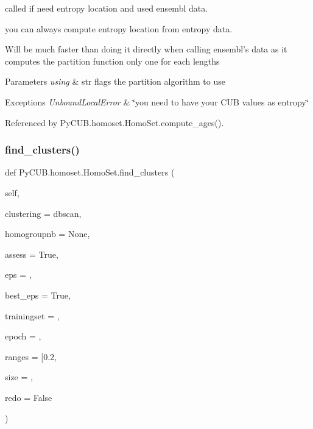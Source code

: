 called if need entropy location and used ensembl data. 

you can always compute entropy location from entropy data. \begin{DoxyVerb}   Will be much faster than doing it directly when calling
   ensembl's data as it computes the partition function
   only one for each lengths
\end{DoxyVerb}



\begin{DoxyParams}{Parameters}
{\em using} & str flags the partition algorithm to use\\
\hline
\end{DoxyParams}

\begin{DoxyExceptions}{Exceptions}
{\em Unbound\+Local\+Error} & \char`\"{}you need to have your C\+U\+B values as entropy\char`\"{} \\
\hline
\end{DoxyExceptions}


Referenced by Py\+C\+U\+B.\+homoset.\+Homo\+Set.\+compute\+\_\+ages().

\mbox{\label{class_py_c_u_b_1_1homoset_1_1_homo_set_a81b40822ff0d1d3e0cfccd6c3c54cdd6}} 
\subsubsection{\texorpdfstring{find\+\_\+clusters()}{find\_clusters()}}
{\footnotesize\ttfamily def Py\+C\+U\+B.\+homoset.\+Homo\+Set.\+find\+\_\+clusters (\begin{DoxyParamCaption}\item[{}]{self,  }\item[{}]{clustering = {\ttfamily \textquotesingle{}dbscan\textquotesingle{}},  }\item[{}]{homogroupnb = {\ttfamily None},  }\item[{}]{assess = {\ttfamily True},  }\item[{}]{eps = {},  }\item[{}]{best\+\_\+eps = {\ttfamily True},  }\item[{}]{trainingset = {},  }\item[{}]{epoch = {},  }\item[{}]{ranges = {\ttfamily \mbox{[}0.2},  }\item[{}]{size = {},  }\item[{}]{redo = {\ttfamily False} }\end{DoxyParamCaption})}



